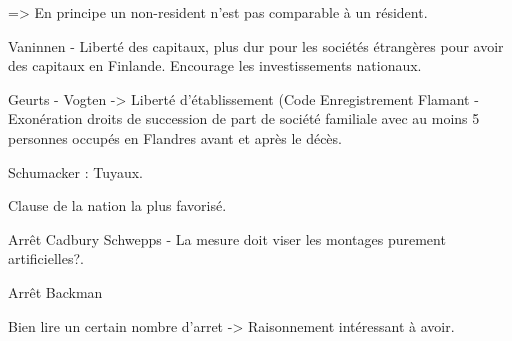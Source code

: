 \documentclass{book}
\begin{document}
=> En principe un non-resident n'est pas comparable à un résident.


Vaninnen - Liberté des capitaux, plus dur pour les sociétés étrangères pour avoir des capitaux en Finlande. Encourage les investissements nationaux.

Geurts - Vogten -> Liberté d'établissement (Code Enregistrement Flamant - Exonération droits de succession de part de société familiale avec au moins 5 personnes occupés en Flandres avant et après le décès.


Schumacker : Tuyaux.

Clause de la nation la plus favorisé.

Arrêt Cadbury Schwepps - La mesure doit viser les montages purement artificielles?.

Arrêt Backman


Bien lire un certain nombre d'arret -> Raisonnement intéressant à avoir.

\nocite{*}

\end{document}
